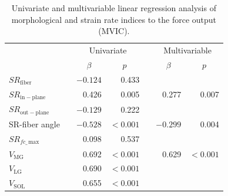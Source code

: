 \begin{table}[!htb]
\vspace{+0.2cm}
\caption[Univariate and multivariable linear regression analysis of morphological and strain rate indices to the force output]{Univariate and multivariable linear regression analysis of morphological and strain rate indices to the force output (MVIC).}
\label{tab: SR1_3}
\begin{center}
\begin{tabular}{@{}lrrrrrr@{}}
\toprule[1pt]\midrule[0.3pt]
               && \multicolumn{2}{c}{Univariate} &  & \multicolumn{2}{c}{Multivariable} \\ \cmidrule(lr){3-4} \cmidrule(lr){6-7}
               && \multicolumn{1}{c}{$\beta$}     & \multicolumn{1}{c}{$p$}            &  & \multicolumn{1}{c}{$\beta$}       & \multicolumn{1}{c}{$p$}              \\ \midrule
$SR_{\mathrm{fiber}}$       & & $-0.124$    & 0.433              &  &            &                     \\ [2pt]
$SR_{\mathrm{in-plane}}$    & & 0.426     & 0.005              &  & 0.277      & 0.007               \\ [2pt]
$SR_{\mathrm{out-plane}}$   & & $-0.129$    & 0.222              &  &            &                     \\ [2pt]
SR-fiber angle 			   & & $-0.528$    & $<0.001$   &  & $-0.299$     & 0.004               \\ [2pt]
$SR_{fc\_\,\mathrm{max}}$  & & 0.098     & 0.537              &  &            &                     \\ [2pt]
$V_{\mathrm{MG}}$          & & 0.692     & $<0.001$   &  & 0.629       & $<0.001$    \\ [2pt]
$V_{\mathrm{LG}}$          & & 0.690     & $<0.001$   &  &            &                     \\ [2pt]
$V_{\mathrm{SOL}}$         & & 0.655     & $<0.001$   &  &            &                     \\ \midrule[0.3pt]\bottomrule[1pt]
\end{tabular}
\end{center}
\vspace{-0.2cm}
\end{table}
